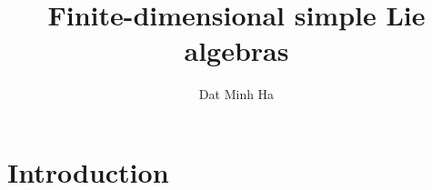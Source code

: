 

\setcounter{section}{-1}





    \title{Finite-dimensional simple Lie algebras}
    
    \author{Dat Minh Ha}
    \maketitle
    
    \begin{abstract}
    
    \end{abstract}
    
    {
    \hypersetup{} 
    \tableofcontents %
    }

    \section{Introduction}

    

    
    
    \printbibliography

